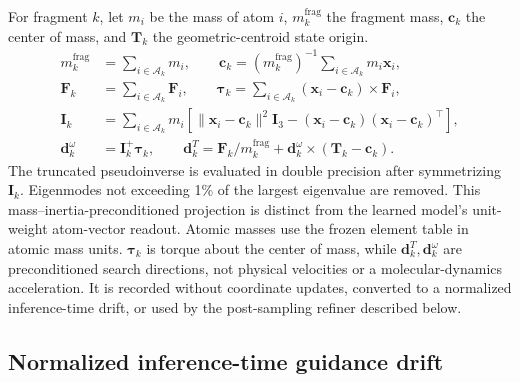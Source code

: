 \documentclass{article}
\renewcommand{\boldsymbol}[1]{\pmb{#1}}
\begin{document}
For fragment \(k\), let \(m_i\) be the mass of atom \(i\), \(m_k^{\mathrm{frag}}\) the fragment mass, \(\mathbf{c}_k\) the center of mass, and \(\mathbf{T}_k\) the geometric-centroid state origin.
\begin{align}
    m_k^{\mathrm{frag}}&=\sum_{i\in\mathcal{A}_k}m_i,\qquad
    \mathbf{c}_k=(m_k^{\mathrm{frag}})^{-1}
      \sum_{i\in\mathcal{A}_k}m_i\mathbf{x}_i,\\
    \mathbf{F}_k&=\sum_{i\in\mathcal{A}_k}\mathbf{F}_i,\qquad
    \boldsymbol{\tau}_k=\sum_{i\in\mathcal{A}_k}
      (\mathbf{x}_i-\mathbf{c}_k)\times\mathbf{F}_i,\\
    \mathbf{I}_k&=\sum_{i\in\mathcal{A}_k}m_i[
      \|\mathbf{x}_i-\mathbf{c}_k\|^2\mathbf{I}_3
      -(\mathbf{x}_i-\mathbf{c}_k)
       (\mathbf{x}_i-\mathbf{c}_k)^\top],\\
    \mathbf{d}_k^\omega&=\mathbf{I}_k^+\boldsymbol{\tau}_k,\qquad
    \mathbf{d}_k^T=\mathbf{F}_k/m_k^{\mathrm{frag}}+
      \mathbf{d}_k^\omega\times(\mathbf{T}_k-\mathbf{c}_k).
    \label{eq:si_force_projection}
\end{align}
The truncated pseudoinverse is evaluated in double precision after symmetrizing \(\mathbf{I}_k\).
Eigenmodes not exceeding 1\% of the largest eigenvalue are removed.
This mass--inertia-preconditioned projection is distinct from the learned model's unit-weight atom-vector readout.
Atomic masses use the frozen element table in atomic mass units. \(\boldsymbol\tau_k\) is torque about the center of mass, while \(\mathbf d_k^T,\mathbf d_k^\omega\) are preconditioned search directions, not physical velocities or a molecular-dynamics acceleration.
It is recorded without coordinate updates, converted to a normalized inference-time drift, or used by the post-sampling refiner described below.

\subsection{Normalized inference-time guidance drift}
\label{si:guidance_drift}
\end{document}

